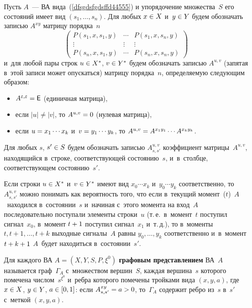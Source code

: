 \begin{multicols}{2}
Пусть $A$~--- ВА вида~(\ref{dfsgdsfgdsffd44555})
и упорядочение множества~$S$ его состояний имеет вид
$(s_1,\ldots, s_n)$. Для любых $x\hm\in X$ и~$y\hm\in Y$
 будем обозначать записью $A^{xy}$ матрицу порядка~$n$
\begin{equation}
\label{dsfdsafdsf5566}
\begin{pmatrix}
P(s_1,x,s_1,y)&\cdots&P(s_1,x,s_n,y)\\
\vdots&\vdots&\vdots\\
P(s_n,x,s_1,y)&\cdots&P(s_n,x,s_n,y)
\end{pmatrix}
\end{equation}
и~для любой пары строк $u\hm\in X^*$, $v\hm\in Y^*$
 будем обозначать записью $A^{u,v}$
(запятая в~этой записи может опускаться) матрицу
порядка~$n$, определяемую следующим образом:
\begin{itemize}
\item $A^{\varepsilon,\varepsilon} \hm= {\sf E}$ (единичная матрица),
 \item если $|u|\neq |v|$,  то $A^{u,v} \hm= 0$ (нулевая матрица),
\item если $u\hm=x_1\cdots x_k$ и~$v\hm=y_1\cdots y_k$,
то $A^{u,v}\hm = A^{x_1y_1}\cdots A^{x_ky_k}$.
\end{itemize}

Для любых $s$, $s'\hm\in S$  будем обозначать
за\-писью $A^{u,v}_{s,s'}$
коэффициент матрицы~$A^{u,v}$, находящийся в~строке,
соответствующей состоянию~$s$, и~в~столбце, соответствующем состоянию~$s'$.

Если строки $u\hm\in X^*$ и~$v\hm\in Y^*$ имеют вид
$x_0\cdots x_k$ и~$y_0\cdots y_k$ соответственно,
то~$A^{u,v}_{s,s'}$ можно понимать как
   вероятность того, что
 если   в~текущий    момент~($t$)~$A$~находился в~состоянии~$s$
   и~начиная с~этого момента  на вход~$A$ последовательно
   поступали элементы строки~$u$
   (т.\,е.\ в~момент~$t$ поступил сигнал~$x_0$,
   в~момент $t\hm+1$ поступил сигнал~$x_1$ и~т.\,д.),
 то в~моменты $t,t+1,\ldots, t+k$
   выходные сигналы~$A$ равны $y_0,\ldots, y_k$ соответственно и~в~момент
   $t\hm+k\hm+1$ $A$~будет находиться в~состоянии~$s'$.

Для каждого ВА $A=(X,Y,S,P,\xi^0)$ \textbf{графовым представлением} ВА~$A$
называется граф~$\Gamma_A$ с~множеством
вершин~$S$,
 каждая вершина~$s$ которого помечена чис\-лом~$s^{\xi^0}$
и~ребра которого помечены тройками вида $(x,y,a)$, где $x\hm\in X$,
$y\hm \in Y$, $a\hm\in [0,1]$:
если $A^{xy}_{s,s'}\hm=a\hm>0$, то~$\Gamma_A$ содержит
ребро из~$s$ в~$s'$  с~меткой $(x,y,a)$.


\end{multicols}

